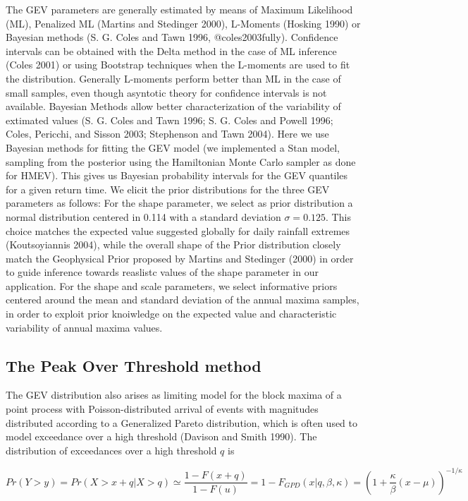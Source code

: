 \documentclass[]{article}
\begin{document}
The GEV parameters are generally estimated by means of Maximum
Likelihood (ML), Penalized ML (Martins and Stedinger 2000), L-Moments
(Hosking 1990) or Bayesian methods (S. G. Coles and Tawn 1996,
@coles2003fully). Confidence intervals can be obtained with the Delta
method in the case of ML inference (Coles 2001) or using Bootstrap
techniques when the L-moments are used to fit the distribution.
Generally L-moments perform better than ML in the case of small samples,
even though asyntotic theory for confidence intervals is not available.
Bayesian Methods allow better characterization of the variability of
extimated values (S. G. Coles and Tawn 1996; S. G. Coles and Powell
1996; Coles, Pericchi, and Sisson 2003; Stephenson and Tawn 2004). Here
we use Bayesian methods for fitting the GEV model (we implemented a Stan
model, sampling from the posterior using the Hamiltonian Monte Carlo
sampler as done for HMEV). This gives us Bayesian probability intervals
for the GEV quantiles for a given return time. We elicit the prior
distributions for the three GEV parameters as follows: For the shape
parameter, we select as prior distribution a normal distribution
centered in 0.114 with a standard deviation \(\sigma = 0.125\). This
choice matches the expected value suggested globally for daily rainfall
extremes (Koutsoyiannis 2004), while the overall shape of the Prior
distribution closely match the Geophysical Prior proposed by Martins and
Stedinger (2000) in order to guide inference towards reaslistc values of
the shape parameter in our application. For the shape and scale
parameters, we select informative priors centered around the mean and
standard deviation of the annual maxima samples, in order to exploit
prior knoiwledge on the expected value and characteristic variability of
annual maxima values.

\hypertarget{the-peak-over-threshold-method}{%
\subsection{The Peak Over Threshold
method}\label{the-peak-over-threshold-method}}

The GEV distribution also arises as limiting model for the block maxima
of a point process with Poisson-distributed arrival of events with
magnitudes distributed according to a Generalized Pareto distribution,
which is often used to model exceedance over a high threshold (Davison
and Smith 1990). The distribution of exceedances over a high threshold
\(q\) is

\begin{equation}
    Pr \left( Y > y\right) = Pr \left( X > x + q \lvert X > q\right) \simeq
    \frac{1 - F(x + q)}{1 - F(u)} = 1 - F_{GPD} \left( x \lvert q, \beta,
    \kappa \right)
    = \left(
    1 + \frac{\kappa}{\beta}\left( x - \mu \right)\right)^{-1/\kappa}
\end{equation}
\end{document}
